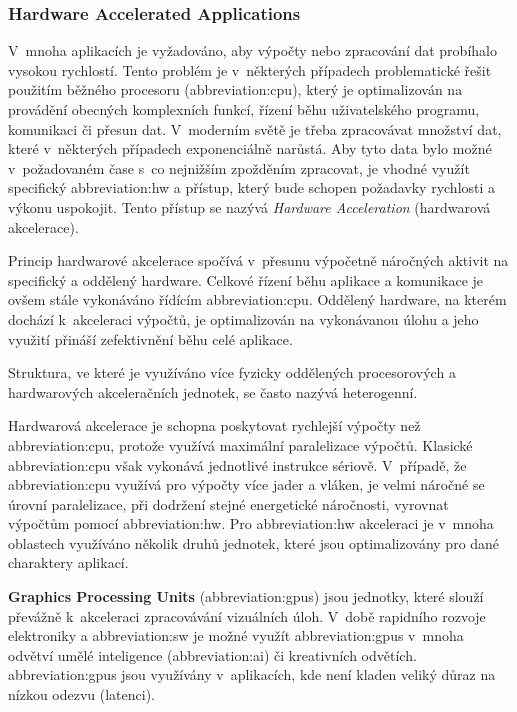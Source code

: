 \documentclass[a4paper, twoside, 11pt]{article}
\begin{document}
		\subsubsection{Hardware Accelerated Applications}\label{subsec:hardware-accelerated-applications}
		V~mnoha aplikacích je vyžadováno, aby výpočty nebo zpracování dat probíhalo vysokou rychlostí. Tento problém je v~některých případech problematické řešit použitím běžného procesoru (\gls{abbreviation:cpu}), který je optimalizován na provádění obecných komplexních funkcí, řízení běhu uživatelského programu, komunikaci či přesun dat. V~moderním světě je třeba zpracovávat množství dat, které v~některých případech exponenciálně narůstá. Aby tyto data bylo možné v~požadovaném čase s~co nejnižším zpožděním zpracovat, je vhodné využít specifický \gls{abbreviation:hw} a přístup, který bude schopen požadavky rychlosti a výkonu uspokojit. Tento přístup se nazývá \textit{Hardware Acceleration} (hardwarová akcelerace). \cite{xilinx-accelerated-computing}\par
		Princip hardwarové akcelerace spočívá v~přesunu výpočetně náročných aktivit na specifický a oddělený hardware. Celkové řízení běhu aplikace a komunikace je ovšem stále vykonáváno řídícím \gls{abbreviation:cpu}. Oddělený hardware, na kterém dochází k~akceleraci výpočtů, je optimalizován na vykonávanou úlohu a jeho využití přináší zefektivnění běhu celé aplikace. \cite{xilinx-accelerated-computing}\par
		Struktura, ve které je využíváno více fyzicky oddělených procesorových a hardwarových akceleračních jednotek, se často nazývá heterogenní. \cite{xilinx-accelerated-computing}\par
		Hardwarová akcelerace je schopna poskytovat rychlejší výpočty než \gls{abbreviation:cpu}, protože využívá maximální paralelizace výpočtů. Klasické \gls{abbreviation:cpu} však vykonává jednotlivé instrukce sériově. V~případě, že \gls{abbreviation:cpu} využívá pro výpočty více jader a vláken, je velmi náročné se úrovní paralelizace, při dodržení stejné energetické náročnosti, vyrovnat výpočtům pomocí \gls{abbreviation:hw}.
		Pro \gls{abbreviation:hw} akceleraci je v~mnoha oblastech využíváno několik druhů jednotek, které jsou optimalizovány pro dané charaktery aplikací.\par
		\textbf{Graphics Processing Units} (\gls{abbreviation:gpus}) jsou jednotky, které slouží převážně k~akceleraci zpracovávání vizuálních úloh. V~době rapidního rozvoje elektroniky a \gls{abbreviation:sw} je možné využít \gls{abbreviation:gpus} v~mnoha odvětví umělé inteligence (\gls{abbreviation:ai}) či kreativních odvětích. \gls{abbreviation:gpus} jsou využívány v~aplikacích, kde není kladen veliký důraz na nízkou odezvu (latenci). \cite{xilinx-accelerated-computing}\par
\end{document}
